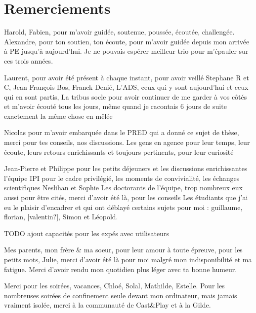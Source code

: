 \chapter*{Remerciements}

Harold, Fabien, pour m'avoir guidée, soutenue, poussée, écoutée, challengée.
Alexandre, pour ton soutien, ton écoute, pour m'avoir guidée depuis mon arrivée à PE jusqu'à aujourd'hui.
Je ne pouvais espérer meilleur trio pour m'épauler sur ces trois années.

Laurent, pour avoir été présent à chaque instant, pour avoir veillé
Stephane R et C, Jean François Bos, Franck Denié,
L'ADS, ceux qui y sont aujourd'hui et ceux qui en sont partis,
La tribus socle pour avoir continuer de me garder à vos côtés et m'avoir écouté tous les jours, même quand je racontais 6 jours de suite exactement la même chose en mêlée

Nicolas pour m'avoir embarquée dans le PRED qui a donné ce sujet de thèse, merci pour tes conseils, nos discussions.
Les gens en agence pour leur temps, leur écoute, leurs retours enrichissants et toujours pertinents, pour leur curiosité

Jean-Pierre et Philippe pour les petits déjeuners et les discussions enrichissantes
l'équipe IPI pour le cadre privilégié, les moments de convivialité, les échanges scientifiques
Neslihan et Sophie
Les doctorants de l'équipe, trop nombreux eux aussi pour être cités, merci d'avoir été là, pour les conseils
Les étudiants que j'ai eu le plaisir d'encadrer et qui ont déblayé certains sujets pour moi : guillaume, florian, [valentin?], Simon et Léopold.

TODO ajout capacités pour les expés avec utilisateurs

Mes parents, mon frère \& ma soeur, pour leur amour à toute épreuve, pour les petits mots,
Julie, merci d'avoir été là pour moi malgré mon indisponibilité et ma fatigue. Merci d'avoir rendu mon quotidien plus léger avec ta bonne humeur.

Merci pour les soirées, vacances, Chloé, Solal, Mathilde, Estelle.
Pour les nombreuses soirées de confinement seule devant mon ordinateur, mais jamais vraiment isolée, merci à la communauté de Cast\&Play et à la Gilde.
